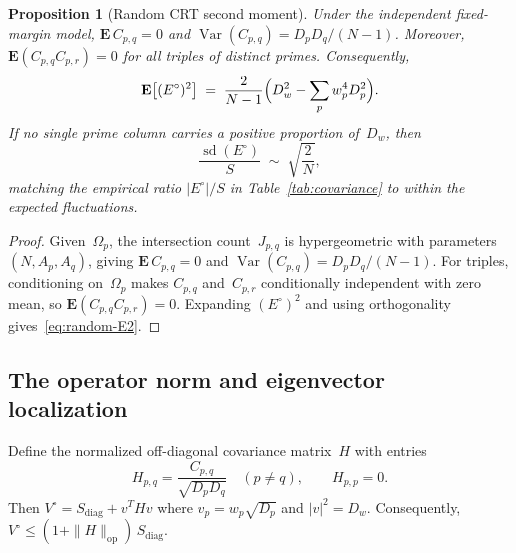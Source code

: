 \documentclass[11pt]{article}
\newtheorem{proposition}[theorem]{Proposition}
\theoremstyle{definition}
\theoremstyle{remark}
\begin{document}
\begin{proposition}[Random CRT second moment]\label{prop:random-crt-moment}
Under the independent fixed-margin model,
$\mathbf{E}\,C_{p,q} = 0$ and
$\operatorname{Var}(C_{p,q}) = D_p D_q/(N-1)$.
Moreover, $\mathbf{E}(C_{p,q} C_{p,r}) = 0$ for
all triples of distinct primes.
Consequently,
\begin{equation}\label{eq:random-E2}
  \mathbf{E}\bigl[(E^\circ)^2\bigr]
  \;=\;
  \frac{2}{N-1}
  \Bigl(D_w^2 - \sum_p w_p^4 D_p^2\Bigr).
\end{equation}
If no single prime column carries a positive
proportion of~$D_w$, then
\begin{equation}\label{eq:random-crt-ratio}
  \frac{\operatorname{sd}(E^\circ)}{S}
  \;\sim\; \sqrt{\frac{2}{N}},
\end{equation}
matching the empirical ratio
$|E^\circ|/S$ in Table~\ref{tab:covariance}
to within the expected fluctuations.
\end{proposition}

\begin{proof}
Given~$\Omega_p$, the intersection count~$J_{p,q}$
is hypergeometric with parameters $(N, A_p, A_q)$,
giving $\mathbf{E}\,C_{p,q} = 0$
and $\operatorname{Var}(C_{p,q}) = D_p D_q/(N-1)$.
For triples, conditioning on~$\Omega_p$ makes
$C_{p,q}$ and~$C_{p,r}$ conditionally independent
with zero mean, so $\mathbf{E}(C_{p,q}C_{p,r})=0$.
Expanding $(E^\circ)^2$ and using orthogonality
gives~\eqref{eq:random-E2}.
\end{proof}

\subsection{The operator norm and eigenvector localization}
\label{ssec:operator-norm}

Define the normalized off-diagonal covariance matrix~$H$
with entries
\[
  H_{p,q} = \frac{C_{p,q}}{\sqrt{D_p D_q}}
  \quad (p \ne q), \qquad
  H_{p,p} = 0.
\]
Then $V^\circ = S_{\mathrm{diag}} + v^T H v$
where $v_p = w_p \sqrt{D_p}$ and $|v|^2 = D_w$.
Consequently, $V^\circ \le (1 + \|H\|_{\mathrm{op}})\,S_{\mathrm{diag}}$.
\end{document}
